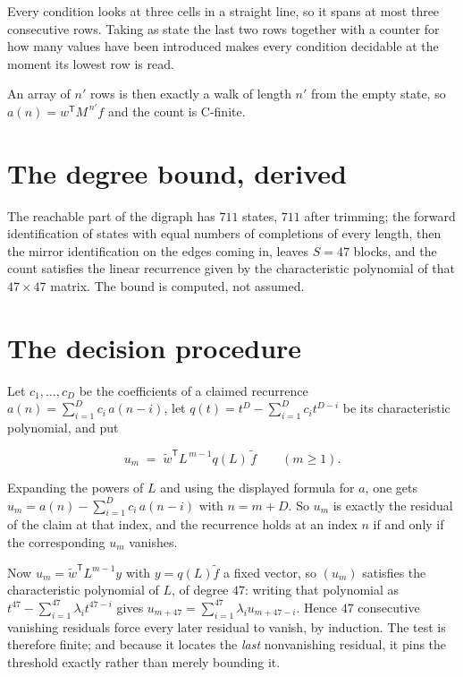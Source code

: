 \documentclass[11pt]{article}
\theoremstyle{definition}
\begin{document}
Every condition looks at three cells in a straight line, so it spans at most three consecutive rows. Taking as state the last two rows together with a counter for how many values have been introduced makes every condition decidable at the moment its lowest row is read.

An array of $n'$ rows is then exactly a walk of length $n'$ from the empty state, so $a(n) = w^{\mathsf T}M^{\,n'}f$ and the count is C-finite.

\section{The degree bound, derived}

The reachable part of the digraph has $711$ states, $711$ after trimming; the forward identification of states with equal numbers of completions of every length, then the mirror identification on the edges coming in, leaves $S = 47$ blocks, and the count satisfies the linear recurrence given by the characteristic polynomial of that $47\times47$ matrix. The bound is computed, not assumed.

\section{The decision procedure}

Let $c_1,\dots,c_D$ be the coefficients of a claimed recurrence $a(n) = \sum_{i=1}^{D} c_i\,a(n-i)$, let $q(t) = t^{D} - \sum_{i=1}^{D} c_i t^{D-i}$ be its characteristic polynomial, and put

\[u_m \;=\; \tilde w^{\mathsf T} L^{\,m-1} q(L)\,\tilde f \qquad (m \ge 1).\]

Expanding the powers of $L$ and using the displayed formula for $a$, one gets $u_m = a(n) - \sum_{i=1}^{D} c_i\,a(n-i)$ with $n = m + D$. So $u_m$ is exactly the residual of the claim at that index, and the recurrence holds at an index $n$ if and only if the corresponding $u_m$ vanishes.

Now $u_m = \tilde w^{\mathsf T} L^{m-1} y$ with $y = q(L)\tilde f$ a fixed vector, so $(u_m)$ satisfies the characteristic polynomial of $L$, of degree $47$: writing that polynomial as $t^{47} - \sum_{i=1}^{47} \lambda_i t^{47-i}$ gives $u_{m+47} = \sum_{i=1}^{47} \lambda_i u_{m+47-i}$. Hence $47$ consecutive vanishing residuals force every later residual to vanish, by induction. The test is therefore finite; and because it locates the {\itshape last} nonvanishing residual, it pins the threshold exactly rather than merely bounding it.
\end{document}
